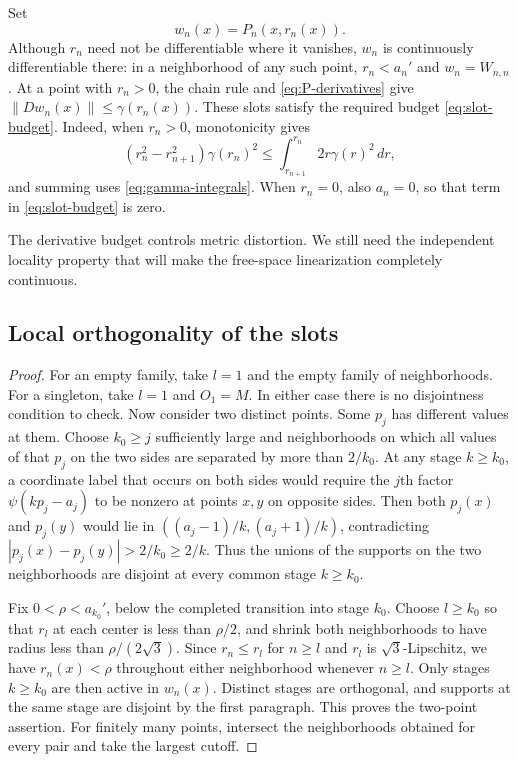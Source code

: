 Set
\begin{equation}
\label{eq:moving-slot}
 w_n(x)=P_n(x,r_n(x)).
\end{equation}
Although $r_n$ need not be differentiable where it vanishes, $w_n$
is continuously differentiable there: in a neighborhood of any such
point, $r_n<a_n'$ and $w_n=W_{n,n}$. At a point with $r_n>0$,
the chain rule and \eqref{eq:P-derivatives} give
$\|Dw_n(x)\|\le\gamma(r_n(x))$. These slots satisfy the required
budget \eqref{eq:slot-budget}. Indeed, when $r_n>0$, monotonicity gives
\[
 (r_n^2-r_{n+1}^2)\gamma(r_n)^2
 \le\int_{r_{n+1}}^{r_n}2r\gamma(r)^2\,dr,
\]
and summing uses \eqref{eq:gamma-integrals}. When $r_n=0$, also
$a_n=0$, so that term in \eqref{eq:slot-budget} is zero.

The derivative budget controls metric distortion. We still need the
independent locality property that will make the free-space
linearization completely continuous.

\subsection{Local orthogonality of the slots}


\begin{proof}
For an empty family, take $l=1$ and the empty family of neighborhoods.
For a singleton, take $l=1$ and $O_1=M$.
In either case there is no disjointness condition to check.
Now consider two distinct points. Some $p_j$ has different values at them.
Choose $k_0\ge j$ sufficiently large and neighborhoods on which all
values of that $p_j$ on the two sides are separated by more than
$2/k_0$. At any stage $k\ge k_0$, a coordinate label that occurs on
both sides would require the $j$th factor $\psi(kp_j-a_j)$ to
be nonzero at points $x,y$ on opposite sides. Then both $p_j(x)$
and $p_j(y)$ would lie in $((a_j-1)/k,(a_j+1)/k)$, contradicting
$|p_j(x)-p_j(y)|>2/k_0\ge2/k$. Thus the unions of the supports on
the two neighborhoods are disjoint at every common stage
$k\ge k_0$.

Fix $0<\rho<a_{k_0}'$, below the completed transition into stage
$k_0$. Choose $l\ge k_0$ so that $r_l$ at each center is less than
$\rho/2$, and shrink both neighborhoods to have radius less than
$\rho/(2\sqrt3)$. Since $r_n\le r_l$ for $n\ge l$ and $r_l$ is
$\sqrt3$-Lipschitz, we have $r_n(x)<\rho$ throughout either
neighborhood whenever $n\ge l$. Only stages $k\ge k_0$ are then
active in $w_n(x)$. Distinct stages are orthogonal, and supports at
the same stage are disjoint by the first paragraph. This proves the
two-point assertion. For finitely many points, intersect the
neighborhoods obtained for every pair and take the largest cutoff.
\end{proof}

